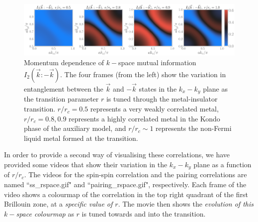 \documentclass[reprint,hidelinks]{revtex4-2}
\begin{document}
\begin{figure}[!htb]
\includegraphics[width=\textwidth]{mutinfo_kspace_all.pdf}
\caption{Momentum dependence of \(k-\)space mutual information \(I_2(\vec k: -\vec k)\). The four frames (from the left) show the variation in entanglement between the \(\vec k\) and \(-\vec k\) states in the \(k_x-k_y\) plane as the transition parameter \(r\) is tuned through the metal-insulator transition. \(r/r_c=0.5\) represents a very weakly correlated metal, \(r/r_c=0.8,0.9\) represents a highly correlated metal in the Kondo phase of the auxiliary model, and \(r/r_c \sim 1\) represents the non-Fermi liquid metal formed at the transition.}
\label{mutinfo_kspace}
\end{figure}

{\color{blue} In order to provide a second way of visualising these correlations, we have provided some videos that show their variation in the \(k_x-k_y\) plane as a function of \(r/r_c\). The videos for the spin-spin correlation and the pairing correlations are named ``ss\_rspace.gif" and ``pairing\_rspace.gif", respectively. Each frame of the video shows a colourmap of the correlation in the top right quadrant of the first Brillouin zone, at a {\it specific value of \(r\)}. The movie then shows the {\it evolution of this \(k-\)space colourmap} as \(r\) is tuned towards and into the transition.}
\end{document}
